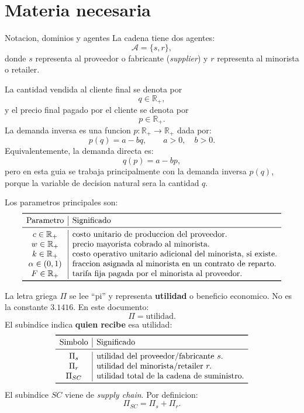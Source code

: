\section{Materia necesaria}

\begin{materia}{Notacion, dominios y agentes}
La cadena tiene dos agentes:
\[
\mathcal{A}=\{s,r\},
\]
donde \(s\) representa al proveedor o fabricante (\emph{supplier}) y \(r\) representa al minorista o retailer.

La cantidad vendida al cliente final se denota por
\[
q\in\mathbb{R}_+,
\]
y el precio final pagado por el cliente se denota por
\[
p\in\mathbb{R}_+.
\]
La demanda inversa es una funcion \(p:\mathbb{R}_+\to\mathbb{R}_+\) dada por:
\[
p(q)=a-bq,
\qquad
a>0,\quad b>0.
\]
Equivalentemente, la demanda directa es:
\[
q(p)=a-bp,
\]
pero en esta guia se trabaja principalmente con la demanda inversa \(p(q)\), porque la variable de decision natural sera la cantidad \(q\).

Los parametros principales son:
\[
\begin{array}{c|l}
\toprule
\text{Parametro} & \text{Significado} \\
\midrule
c\in\mathbb{R}_+ & \text{costo unitario de produccion del proveedor.}\\
w\in\mathbb{R}_+ & \text{precio mayorista cobrado al minorista.}\\
k\in\mathbb{R}_+ & \text{costo operativo unitario adicional del minorista, si existe.}\\
\alpha\in(0,1) & \text{fraccion asignada al minorista en un contrato de reparto.}\\
F\in\mathbb{R}_+ & \text{tarifa fija pagada por el minorista al proveedor.}\\
\bottomrule
\end{array}
\]

La letra griega \(\Pi\) se lee ``pi'' y representa \textbf{utilidad} o beneficio economico. No es la constante \(3.1416\). En este documento:
\[
\Pi=\text{utilidad}.
\]
El subindice indica \textbf{quien recibe} esa utilidad:
\[
\begin{array}{c|l}
\toprule
\text{Simbolo} & \text{Significado} \\
\midrule
\Pi_s & \text{utilidad del proveedor/fabricante } s.\\
\Pi_r & \text{utilidad del minorista/retailer } r.\\
\Pi_{SC} & \text{utilidad total de la cadena de suministro.}\\
\bottomrule
\end{array}
\]
El subindice \(SC\) viene de \emph{supply chain}. Por definicion:
\[
\Pi_{SC}=\Pi_s+\Pi_r.
\]


\end{materia}
